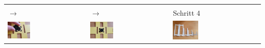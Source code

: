 \begin{center}
\begin{tabular}{*{3}{l}}
				\\
				\\[-0.5em]
				$\rightarrow$ & \multicolumn{1}{l|}{$\rightarrow$} & Schritt 4 \\
				\midrule
				\includegraphics[width=0.3\textwidth]{images/aufbau/3_2.jpg} &
				\multicolumn{1}{l|}{\includegraphics[width=0.3\textwidth]{images/aufbau/3_3.jpg}} &
				\includegraphics[width=0.3\textwidth]{images/aufbau/4_1.jpg} 
				\\
			\end{tabular}
		\end{center}
		\vfill
		\newpage

